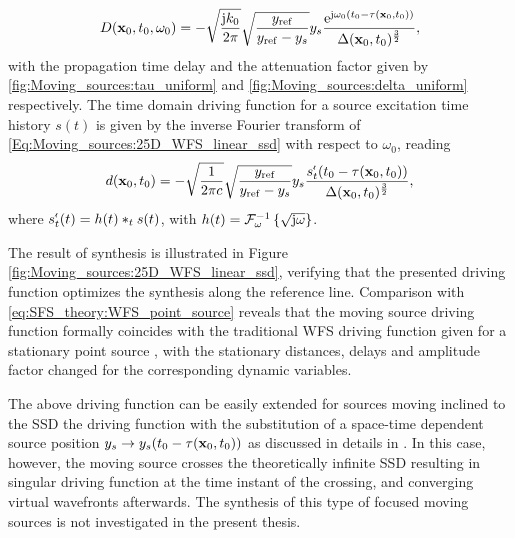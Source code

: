 \begin{equation}
D(\mathbf{x}_0,t_0,\omega_0) = -
\sqrt{\frac{ \mathrm{j} k_0}{2\pi} }
\sqrt{\frac{ y_{\mathrm{ref}} }{y_{\mathrm{ref}}-y_s}}
y_s
\frac{\mathrm{e}^{\mathrm{j} \omega_0\left( t_0 - \tau( \mathbf{x}_0,t_0 )\right)}}{\Delta(\mathbf{x}_0,t_0)^{\frac{3}{2}}},
\label{Eq:Moving_sources:25D_WFS_linear_ssd}
\end{equation}
with the propagation time delay and the attenuation factor given by \eqref{fig:Moving_sources:tau_uniform} and \eqref{fig:Moving_sources:delta_uniform} respectively.
The time domain driving function for a source excitation time history $s(t)$ is given by the inverse Fourier transform of \eqref{Eq:Moving_sources:25D_WFS_linear_ssd} with respect to $\omega_0$, reading 
\begin{equation}
d(\mathbf{x}_0,t_0) = -
\sqrt{\frac{ 1 }{2\pi c} }
\sqrt{\frac{ y_{\mathrm{ref}} }{y_{\mathrm{ref}}-y_s}}
y_s
\frac{s^{\nshortmid}_t(t_0 - \tau( \mathbf{x}_0,t_0 ))}{\Delta(\mathbf{x}_0,t_0)^{\frac{3}{2}}},
\label{Eq:Moving_sources:25D_WFS_linear_ssd_td}
\end{equation}
where $s^{\nshortmid}_t(t) = h(t) \ast_{t} s(t)$, with $h(t) = \mathcal{F}^{-1}_{\omega}\left\{ \sqrt{\mathrm{j} \omega} \right\}$.

The result of synthesis is illustrated in Figure \ref{fig:Moving_sources:25D_WFS_linear_ssd}, verifying that the presented driving function optimizes the synthesis along the reference line.
Comparison with \eqref{eq:SFS_theory:WFS_point_source} reveals that the moving source driving function formally coincides with the traditional WFS driving function given for a stationary point source \cite[(2.27)]{Verheijen1997:phd}, \cite[(3.16)\&(3.17)]{Start1997:phd} with the stationary distances, delays and amplitude factor changed for the corresponding dynamic variables.

The above driving function can be easily extended for sources moving inclined to the SSD the driving function with the substitution of a space-time dependent source position $y_s \rightarrow y_s(t_0 - \tau(\mathbf{x}_0,t_0))$ as discussed in details in \cite{firtha2016wave}.
In this case, however, the moving source crosses the theoretically infinite SSD resulting in singular driving function at the time instant of the crossing, and converging virtual wavefronts afterwards.
The synthesis of this type of focused moving sources is not investigated in the present thesis.

